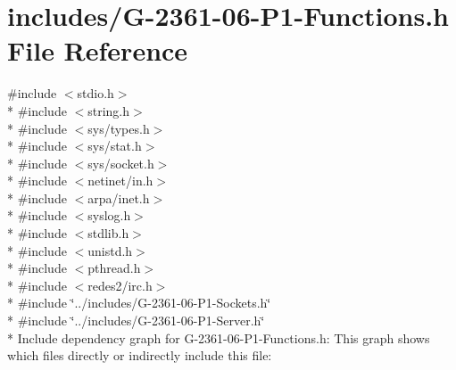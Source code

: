 \hypertarget{_g-2361-06-_p1-_functions_8h}{}\section{includes/\+G-\/2361-\/06-\/\+P1-\/\+Functions.h File Reference}
\label{_g-2361-06-_p1-_functions_8h}
{\ttfamily \#include $<$stdio.\+h$>$}\\*
{\ttfamily \#include $<$string.\+h$>$}\\*
{\ttfamily \#include $<$sys/types.\+h$>$}\\*
{\ttfamily \#include $<$sys/stat.\+h$>$}\\*
{\ttfamily \#include $<$sys/socket.\+h$>$}\\*
{\ttfamily \#include $<$netinet/in.\+h$>$}\\*
{\ttfamily \#include $<$arpa/inet.\+h$>$}\\*
{\ttfamily \#include $<$syslog.\+h$>$}\\*
{\ttfamily \#include $<$stdlib.\+h$>$}\\*
{\ttfamily \#include $<$unistd.\+h$>$}\\*
{\ttfamily \#include $<$pthread.\+h$>$}\\*
{\ttfamily \#include $<$redes2/irc.\+h$>$}\\*
{\ttfamily \#include \char`\"{}../includes/\+G-\/2361-\/06-\/\+P1-\/\+Sockets.\+h\char`\"{}}\\*
{\ttfamily \#include \char`\"{}../includes/\+G-\/2361-\/06-\/\+P1-\/\+Server.\+h\char`\"{}}\\*
Include dependency graph for G-\/2361-\/06-\/\+P1-\/\+Functions.h\+:
This graph shows which files directly or indirectly include this file\+:
